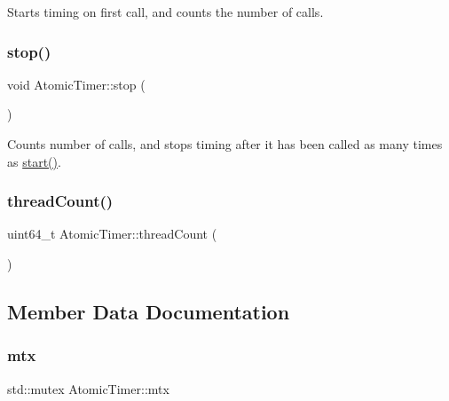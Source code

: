 Starts timing on first call, and counts the number of calls. \mbox{\label{class_atomic_timer_a1d561f0cf035fb0d4d2ec8bb6326fc02}} 
\subsubsection{\texorpdfstring{stop()}{stop()}}
{\footnotesize\ttfamily void Atomic\+Timer\+::stop (\begin{DoxyParamCaption}{ }\end{DoxyParamCaption})}

Counts number of calls, and stops timing after it has been called as many times as \mbox{\hyperlink{class_atomic_timer_ad3e5da55d9fafde1d848bf238ae5a8cd}{start()}}. \mbox{\label{class_atomic_timer_a3187c954dd818871ca79449264ec0b21}} 
\subsubsection{\texorpdfstring{thread\+Count()}{threadCount()}}
{\footnotesize\ttfamily uint64\+\_\+t Atomic\+Timer\+::thread\+Count (\begin{DoxyParamCaption}{ }\end{DoxyParamCaption})}



\subsection{Member Data Documentation}
\mbox{\label{class_atomic_timer_a125e687b5e4c1ab65582d696d0434904}} 
\subsubsection{\texorpdfstring{mtx}{mtx}}
{\footnotesize\ttfamily std\+::mutex Atomic\+Timer\+::mtx\hspace{0.3cm}{\ttfamily [private]}}

\mbox{\label{class_atomic_timer_acc544ac3506486f3daf2369b6ad5bfb5}} 
